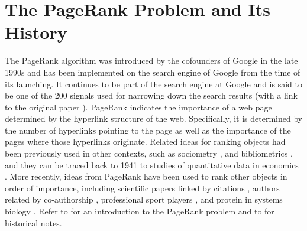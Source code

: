 \documentclass[11pt,draftcls,onecolumn]{IEEEtran}
\begin{document}
\newpage
\section*{The PageRank Problem and Its History}

The PageRank algorithm was introduced by the cofounders of Google 
in the late 1990s \cite{BriPag:98} and has been implemented on the search engine of Google
from the time of its launching. 
%
It continues to be part of the search engine at Google and is said to be
one of the 200 signals used for narrowing down the search results \cite{google:13}
(with a link to the original paper \cite{BriPag:98}).
PageRank indicates the importance of a web page determined by the hyperlink structure 
of the web. Specifically, it is determined by the number of hyperlinks pointing to 
the page as well as the importance of the pages where those hyperlinks originate.
Related ideas for ranking objects had been previously used in other contexts, 
such as sociometry \cite{Hubbell:65}, and bibliometrics \cite{PinNar:76},
and they can be traced back to 1941 
to studies of quantitative data in economics \cite{Leontief:41}.
More recently, ideas from PageRank have been used to rank other objects in order of importance, including scientific papers linked by citations \cite{CXMR:09}, authors related by co-authorship 
\cite{LiBoNede:05}, professional sport players 
\cite{Radicchi:11}, and protein in systems biology \cite{ZaBeEf:12}. 
Refer to \cite{LanMey:06} for an introduction to the PageRank problem and to
\cite{Franceschet:11} for historical notes.
\end{document}
